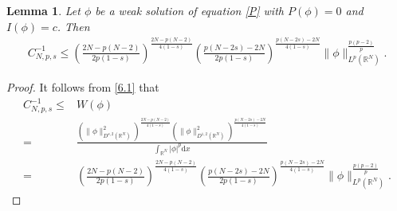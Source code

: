 \documentclass[12pt,a4paper,reqno]{amsart}
\numberwithin{equation}{section}
\newtheorem{lemma}{Lemma}[section]
\begin{document}
\begin{lemma}\label{Lemma6.2}
Let $\phi$ be a weak solution of equation \eqref{P} with $P(\phi)=0$ and $I(\phi)=c$.
Then
\begin{equation*}
\begin{aligned}
C_{N,p,s}^{-1}\leqslant
\left(
\frac{2N-p(N-2)}{2p(1-s)}
\right)
^{\frac{2N-p(N-2)}{4(1-s)}}
\left(
\frac{p(N-2s)-2N}{2p(1-s)}
\right)
^{\frac{p(N-2s)-2N}{4(1-s)}}
\|\phi\|_{L^{p}(\mathbb{R}^{N})}^{\frac{p(p-2)}{p}}.
\end{aligned}
\end{equation*}
\end{lemma}
\begin{proof}
It follows from \eqref{6.1} that
\begin{equation*}
\begin{aligned}
C_{N,p,s}^{-1}\leqslant& W(\phi)\\
=&
\frac
{\left(
\|\phi\|_{D^{s,2}(\mathbb{R}^{N})}^{2}
\right)
^{\frac{2N-p(N-2)}{4(1-s)}}
\left(
\|\phi\|_{D^{1,2}(\mathbb{R}^{N})}^{2}
\right)
^{\frac{p(N-2s)-2N}{4(1-s)}}}
{\int_{\mathbb{R}^{N}}
|\phi|^{p}
\mathrm{d}x}\\
=&\left(
\frac{2N-p(N-2)}{2p(1-s)}
\right)
^{\frac{2N-p(N-2)}{4(1-s)}}
\left(
\frac{p(N-2s)-2N}{2p(1-s)}
\right)
^{\frac{p(N-2s)-2N}{4(1-s)}}
\|\phi\|_{L^{p}(\mathbb{R}^{N})}^{\frac{p(p-2)}{p}}.
\end{aligned}
\end{equation*}
\end{proof}
\end{document}
